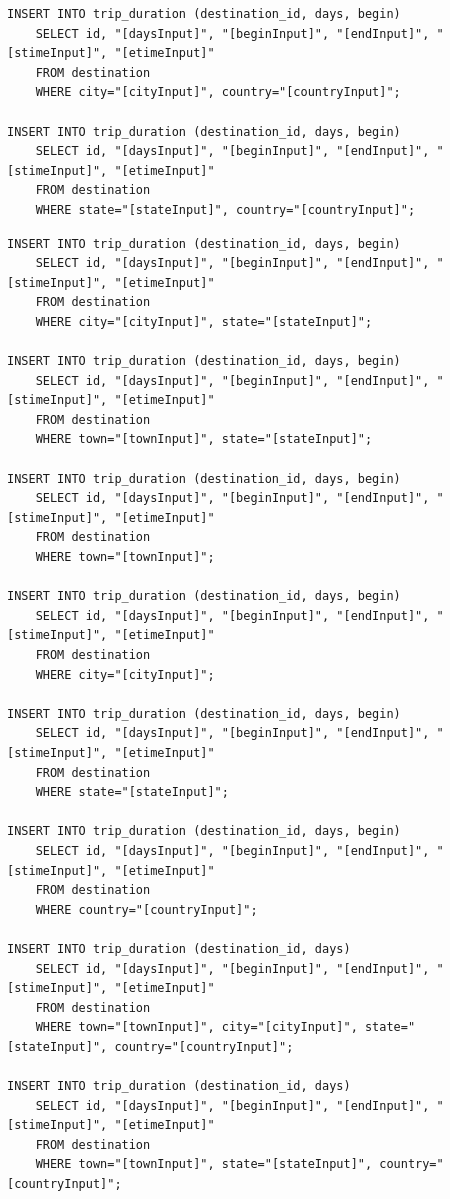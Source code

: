 \documentclass[letterpaper,10pt,onecolumn,compsoc]{IEEEtran}
\begin{document}
\begin{verbatim}
INSERT INTO trip_duration (destination_id, days, begin) 
	SELECT id, "[daysInput]", "[beginInput]", "[endInput]", "[stimeInput]", "[etimeInput]" 
	FROM destination 
	WHERE city="[cityInput]", country="[countryInput]";
	
INSERT INTO trip_duration (destination_id, days, begin) 
	SELECT id, "[daysInput]", "[beginInput]", "[endInput]", "[stimeInput]", "[etimeInput]" 
	FROM destination 
	WHERE state="[stateInput]", country="[countryInput]";
\end{verbatim}

\newpage

\begin{verbatim}
INSERT INTO trip_duration (destination_id, days, begin) 
	SELECT id, "[daysInput]", "[beginInput]", "[endInput]", "[stimeInput]", "[etimeInput]" 
	FROM destination 
	WHERE city="[cityInput]", state="[stateInput]";
	
INSERT INTO trip_duration (destination_id, days, begin) 
	SELECT id, "[daysInput]", "[beginInput]", "[endInput]", "[stimeInput]", "[etimeInput]" 
	FROM destination 
	WHERE town="[townInput]", state="[stateInput]";
	
INSERT INTO trip_duration (destination_id, days, begin) 
	SELECT id, "[daysInput]", "[beginInput]", "[endInput]", "[stimeInput]", "[etimeInput]" 
	FROM destination 
	WHERE town="[townInput]";
	
INSERT INTO trip_duration (destination_id, days, begin) 
	SELECT id, "[daysInput]", "[beginInput]", "[endInput]", "[stimeInput]", "[etimeInput]" 
	FROM destination 
	WHERE city="[cityInput]";
	
INSERT INTO trip_duration (destination_id, days, begin) 
	SELECT id, "[daysInput]", "[beginInput]", "[endInput]", "[stimeInput]", "[etimeInput]" 
	FROM destination 
	WHERE state="[stateInput]";
	
INSERT INTO trip_duration (destination_id, days, begin) 
	SELECT id, "[daysInput]", "[beginInput]", "[endInput]", "[stimeInput]", "[etimeInput]" 
	FROM destination 
	WHERE country="[countryInput]";
	
INSERT INTO trip_duration (destination_id, days) 
	SELECT id, "[daysInput]", "[beginInput]", "[endInput]", "[stimeInput]", "[etimeInput]" 
	FROM destination 
	WHERE town="[townInput]", city="[cityInput]", state="[stateInput]", country="[countryInput]";
	
INSERT INTO trip_duration (destination_id, days) 
	SELECT id, "[daysInput]", "[beginInput]", "[endInput]", "[stimeInput]", "[etimeInput]" 
	FROM destination 
	WHERE town="[townInput]", state="[stateInput]", country="[countryInput]";
	

\end{verbatim}
\end{document}

